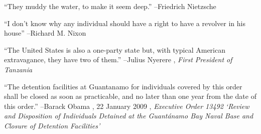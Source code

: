 \documentclass{article}%
\begin{document}
\linebreak%
\vspace{1mm}%
\begin{minipage}{\textwidth}%
\flushleft%
“They muddy the water, to make it seem deep.”%
\linebreak%
\vspace{1mm}%
–Friedrich Nietzsche%
\linebreak%
\vspace{1mm}%
\end{minipage}%
\linebreak%
\vspace{1mm}%
\begin{minipage}{\textwidth}%
\flushleft%
“I don't know why any individual should have a right to have a revolver in his house”%
\linebreak%
\vspace{1mm}%
–Richard M. Nixon%
\linebreak%
\vspace{1mm}%
\end{minipage}%
\linebreak%
\vspace{1mm}%
\begin{minipage}{\textwidth}%
\flushleft%
“The United States is also a one{-}party state but, with typical American extravagance, they have two of them.”%
\linebreak%
\vspace{1mm}%
–Julius Nyerere%
, \textit{First President of Tanzania}%
\linebreak%
\vspace{1mm}%
\end{minipage}%
\linebreak%
\vspace{1mm}%
\begin{minipage}{\textwidth}%
\flushleft%
“The detention facilities at Guantanamo for individuals covered by this order shall be closed as soon as practicable, and no later than one year from the date of this order.”%
\linebreak%
\vspace{1mm}%
–Barack Obama%
, 22 January 2009%
, \textit{Executive Order 13492 ‘Review and Disposition of Individuals Detained at the Guantánamo Bay Naval Base and Closure of Detention Facilities’}%
\linebreak%
\vspace{1mm}%
\end{minipage}%
\linebreak%
\vspace{1mm}%
\end{document}
